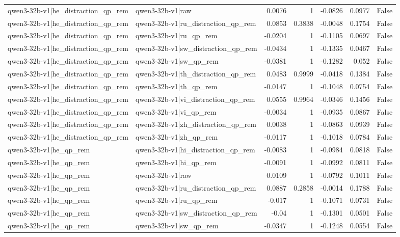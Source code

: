 \begin{table}
\begin{tabular}{l l r r r r l}
qwen3-32b-v1|he_distraction_qp_rem & qwen3-32b-v1|raw & 0.0076 & 1 & -0.0826 & 0.0977 & False \\
qwen3-32b-v1|he_distraction_qp_rem & qwen3-32b-v1|ru_distraction_qp_rem & 0.0853 & 0.3838 & -0.0048 & 0.1754 & False \\
qwen3-32b-v1|he_distraction_qp_rem & qwen3-32b-v1|ru_qp_rem & -0.0204 & 1 & -0.1105 & 0.0697 & False \\
qwen3-32b-v1|he_distraction_qp_rem & qwen3-32b-v1|sw_distraction_qp_rem & -0.0434 & 1 & -0.1335 & 0.0467 & False \\
qwen3-32b-v1|he_distraction_qp_rem & qwen3-32b-v1|sw_qp_rem & -0.0381 & 1 & -0.1282 & 0.052 & False \\
qwen3-32b-v1|he_distraction_qp_rem & qwen3-32b-v1|th_distraction_qp_rem & 0.0483 & 0.9999 & -0.0418 & 0.1384 & False \\
qwen3-32b-v1|he_distraction_qp_rem & qwen3-32b-v1|th_qp_rem & -0.0147 & 1 & -0.1048 & 0.0754 & False \\
qwen3-32b-v1|he_distraction_qp_rem & qwen3-32b-v1|vi_distraction_qp_rem & 0.0555 & 0.9964 & -0.0346 & 0.1456 & False \\
qwen3-32b-v1|he_distraction_qp_rem & qwen3-32b-v1|vi_qp_rem & -0.0034 & 1 & -0.0935 & 0.0867 & False \\
qwen3-32b-v1|he_distraction_qp_rem & qwen3-32b-v1|zh_distraction_qp_rem & 0.0038 & 1 & -0.0863 & 0.0939 & False \\
qwen3-32b-v1|he_distraction_qp_rem & qwen3-32b-v1|zh_qp_rem & -0.0117 & 1 & -0.1018 & 0.0784 & False \\
qwen3-32b-v1|he_qp_rem & qwen3-32b-v1|hi_distraction_qp_rem & -0.0083 & 1 & -0.0984 & 0.0818 & False \\
qwen3-32b-v1|he_qp_rem & qwen3-32b-v1|hi_qp_rem & -0.0091 & 1 & -0.0992 & 0.0811 & False \\
qwen3-32b-v1|he_qp_rem & qwen3-32b-v1|raw & 0.0109 & 1 & -0.0792 & 0.1011 & False \\
qwen3-32b-v1|he_qp_rem & qwen3-32b-v1|ru_distraction_qp_rem & 0.0887 & 0.2858 & -0.0014 & 0.1788 & False \\
qwen3-32b-v1|he_qp_rem & qwen3-32b-v1|ru_qp_rem & -0.017 & 1 & -0.1071 & 0.0731 & False \\
qwen3-32b-v1|he_qp_rem & qwen3-32b-v1|sw_distraction_qp_rem & -0.04 & 1 & -0.1301 & 0.0501 & False \\
qwen3-32b-v1|he_qp_rem & qwen3-32b-v1|sw_qp_rem & -0.0347 & 1 & -0.1248 & 0.0554 & False \\

\end{tabular}
\end{table}
